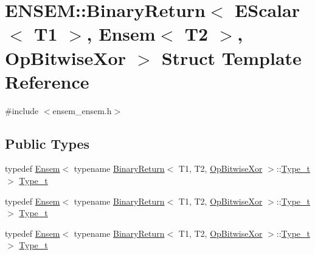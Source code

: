 \hypertarget{structENSEM_1_1BinaryReturn_3_01EScalar_3_01T1_01_4_00_01Ensem_3_01T2_01_4_00_01OpBitwiseXor_01_4}{}\section{E\+N\+S\+EM\+:\+:Binary\+Return$<$ E\+Scalar$<$ T1 $>$, Ensem$<$ T2 $>$, Op\+Bitwise\+Xor $>$ Struct Template Reference}
\label{structENSEM_1_1BinaryReturn_3_01EScalar_3_01T1_01_4_00_01Ensem_3_01T2_01_4_00_01OpBitwiseXor_01_4}


{\ttfamily \#include $<$ensem\+\_\+ensem.\+h$>$}

\subsection*{Public Types}
\begin{DoxyCompactItemize}
\item 
typedef \mbox{\hyperlink{classENSEM_1_1Ensem}{Ensem}}$<$ typename \mbox{\hyperlink{structENSEM_1_1BinaryReturn}{Binary\+Return}}$<$ T1, T2, \mbox{\hyperlink{structENSEM_1_1OpBitwiseXor}{Op\+Bitwise\+Xor}} $>$\+::\mbox{\hyperlink{structENSEM_1_1BinaryReturn_3_01EScalar_3_01T1_01_4_00_01Ensem_3_01T2_01_4_00_01OpBitwiseXor_01_4_a08cef6d7aa7262985d42b0a1afe37f79}{Type\+\_\+t}} $>$ \mbox{\hyperlink{structENSEM_1_1BinaryReturn_3_01EScalar_3_01T1_01_4_00_01Ensem_3_01T2_01_4_00_01OpBitwiseXor_01_4_a08cef6d7aa7262985d42b0a1afe37f79}{Type\+\_\+t}}
\item 
typedef \mbox{\hyperlink{classENSEM_1_1Ensem}{Ensem}}$<$ typename \mbox{\hyperlink{structENSEM_1_1BinaryReturn}{Binary\+Return}}$<$ T1, T2, \mbox{\hyperlink{structENSEM_1_1OpBitwiseXor}{Op\+Bitwise\+Xor}} $>$\+::\mbox{\hyperlink{structENSEM_1_1BinaryReturn_3_01EScalar_3_01T1_01_4_00_01Ensem_3_01T2_01_4_00_01OpBitwiseXor_01_4_a08cef6d7aa7262985d42b0a1afe37f79}{Type\+\_\+t}} $>$ \mbox{\hyperlink{structENSEM_1_1BinaryReturn_3_01EScalar_3_01T1_01_4_00_01Ensem_3_01T2_01_4_00_01OpBitwiseXor_01_4_a08cef6d7aa7262985d42b0a1afe37f79}{Type\+\_\+t}}
\item 
typedef \mbox{\hyperlink{classENSEM_1_1Ensem}{Ensem}}$<$ typename \mbox{\hyperlink{structENSEM_1_1BinaryReturn}{Binary\+Return}}$<$ T1, T2, \mbox{\hyperlink{structENSEM_1_1OpBitwiseXor}{Op\+Bitwise\+Xor}} $>$\+::\mbox{\hyperlink{structENSEM_1_1BinaryReturn_3_01EScalar_3_01T1_01_4_00_01Ensem_3_01T2_01_4_00_01OpBitwiseXor_01_4_a08cef6d7aa7262985d42b0a1afe37f79}{Type\+\_\+t}} $>$ \mbox{\hyperlink{structENSEM_1_1BinaryReturn_3_01EScalar_3_01T1_01_4_00_01Ensem_3_01T2_01_4_00_01OpBitwiseXor_01_4_a08cef6d7aa7262985d42b0a1afe37f79}{Type\+\_\+t}}
\end{DoxyCompactItemize}


